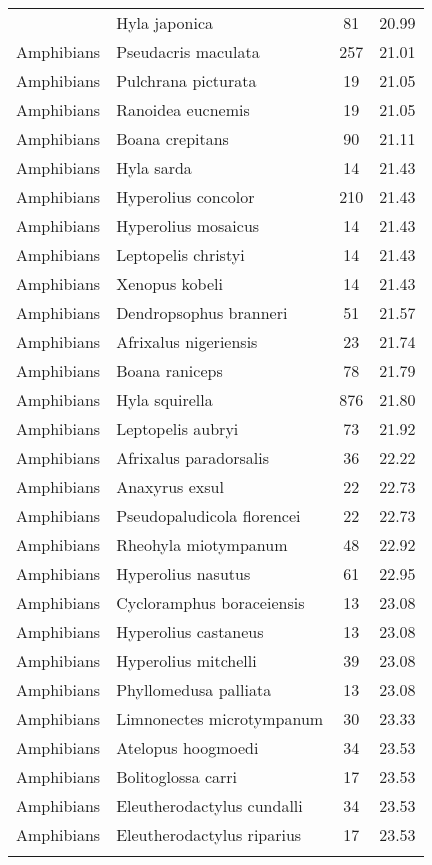 \begin{longtable}{llcc}
{  Amphibians & Hyla japonica &  81 & 20.99 \\ 
  Amphibians & Pseudacris maculata & 257 & 21.01 \\ 
  Amphibians & Pulchrana picturata &  19 & 21.05 \\ 
  Amphibians & Ranoidea eucnemis &  19 & 21.05 \\ 
  Amphibians & Boana crepitans &  90 & 21.11 \\ 
  Amphibians & Hyla sarda &  14 & 21.43 \\ 
  Amphibians & Hyperolius concolor & 210 & 21.43 \\ 
  Amphibians & Hyperolius mosaicus &  14 & 21.43 \\ 
  Amphibians & Leptopelis christyi &  14 & 21.43 \\ 
  Amphibians & Xenopus kobeli &  14 & 21.43 \\ 
  Amphibians & Dendropsophus branneri &  51 & 21.57 \\ 
  Amphibians & Afrixalus nigeriensis &  23 & 21.74 \\ 
  Amphibians & Boana raniceps &  78 & 21.79 \\ 
  Amphibians & Hyla squirella & 876 & 21.80 \\ 
  Amphibians & Leptopelis aubryi &  73 & 21.92 \\ 
  Amphibians & Afrixalus paradorsalis &  36 & 22.22 \\ 
  Amphibians & Anaxyrus exsul &  22 & 22.73 \\ 
  Amphibians & Pseudopaludicola florencei &  22 & 22.73 \\ 
  Amphibians & Rheohyla miotympanum &  48 & 22.92 \\ 
  Amphibians & Hyperolius nasutus &  61 & 22.95 \\ 
  Amphibians & Cycloramphus boraceiensis &  13 & 23.08 \\ 
  Amphibians & Hyperolius castaneus &  13 & 23.08 \\ 
  Amphibians & Hyperolius mitchelli &  39 & 23.08 \\ 
  Amphibians & Phyllomedusa palliata &  13 & 23.08 \\ 
  Amphibians & Limnonectes microtympanum &  30 & 23.33 \\ 
  Amphibians & Atelopus hoogmoedi &  34 & 23.53 \\ 
  Amphibians & Bolitoglossa carri &  17 & 23.53 \\ 
  Amphibians & Eleutherodactylus cundalli &  34 & 23.53 \\ 
  Amphibians & Eleutherodactylus riparius &  17 & 23.53 \\ 
}
\end{longtable}
